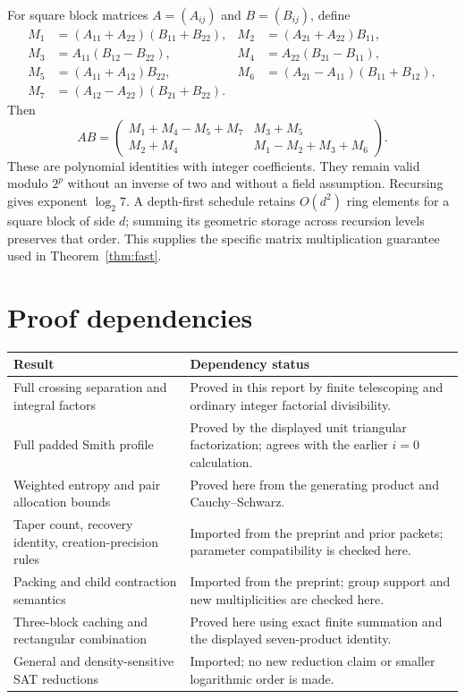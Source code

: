 \documentclass[11pt,letterpaper]{article}
\theoremstyle{definition}\newtheorem{definition}[theorem]{Definition}
\theoremstyle{remark}\newtheorem{remark}[theorem]{Remark}
\begin{document}
For square block matrices $A=(A_{ij})$ and $B=(B_{ij})$, define
\begin{align*}
 M_1&=(A_{11}+A_{22})(B_{11}+B_{22}),&
 M_2&=(A_{21}+A_{22})B_{11},\\
 M_3&=A_{11}(B_{12}-B_{22}),&
 M_4&=A_{22}(B_{21}-B_{11}),\\
 M_5&=(A_{11}+A_{12})B_{22},&
 M_6&=(A_{21}-A_{11})(B_{11}+B_{12}),\\
 M_7&=(A_{12}-A_{22})(B_{21}+B_{22}).
\end{align*}
Then
\[
 AB=\begin{pmatrix}
 M_1+M_4-M_5+M_7 & M_3+M_5\\
 M_2+M_4 & M_1-M_2+M_3+M_6
 \end{pmatrix}.
\]
These are polynomial identities with integer coefficients. They remain valid
modulo $2^p$ without an inverse of two and without a field assumption.
Recursing gives exponent $\log_2 7$. A depth-first schedule retains
$O(d^2)$ ring elements for a square block of side $d$; summing its geometric
storage across recursion levels preserves that order. This supplies the
specific matrix multiplication guarantee used in Theorem~\ref{thm:fast}.

\section{Proof dependencies}

\begin{center}\small
\begin{tabular}{@{}p{}p{}@{}}\toprule
Result & Dependency status\\\midrule
Full crossing separation and integral factors & Proved in this report by
finite telescoping and ordinary integer factorial divisibility.\\[4pt]
Full padded Smith profile & Proved by the displayed unit triangular
factorization; agrees with the earlier $i=0$ calculation.\\[4pt]
Weighted entropy and pair allocation bounds & Proved here from the generating
product and Cauchy--Schwarz.\\[4pt]
Taper count, recovery identity, creation-precision rules & Imported from the
preprint and prior packets; parameter compatibility is checked here.\\[4pt]
Packing and child contraction semantics & Imported from the preprint;
group support and new multiplicities are checked here.\\[4pt]
Three-block caching and rectangular combination & Proved here using exact
finite summation and the displayed seven-product identity.\\[4pt]
General and density-sensitive SAT reductions & Imported; no new reduction
claim or smaller logarithmic order is made.\\
\bottomrule\end{tabular}
\end{center}
\end{document}
